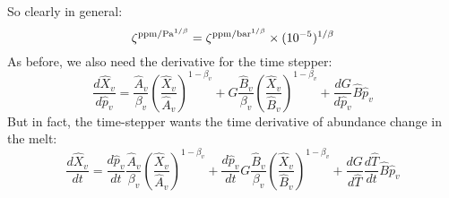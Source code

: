 So clearly in general:
\begin{equation}
\zeta^{{\rm ppm/Pa}^{1/\beta}} = \zeta^{{\rm ppm/bar}^{1/\beta}} \times (10^{-5})^{1/\beta}
\end{equation}
As before, we also need the derivative for the time stepper:
\begin{equation}
\frac{d \hat{X}_v}{d \hat{p}_v} = \frac{\hat{A}_v}{\beta_v} \left(\frac{\hat{X}_v}{\hat{A}_v}\right)^{1-\beta_v} + G \frac{\hat{B}_v}{\beta_v} \left(\frac{\hat{X}_v}{\hat{B}_v}\right)^{1-\beta_v} + \frac{dG}{d \hat{p}_v} \hat{B} \hat{p}_v
\end{equation}
But in fact, the time-stepper wants the time derivative of abundance change in the melt:
\begin{equation}
\frac{d \hat{X}_v}{d t} = \frac{d \hat{p}_v}{d t} \frac{\hat{A}_v}{\beta_v} \left(\frac{\hat{X}_v}{\hat{A}_v}\right)^{1-\beta_v} + \frac{d \hat{p}_v}{d t} G \frac{\hat{B}_v}{\beta_v} \left(\frac{\hat{X}_v}{\hat{B}_v}\right)^{1-\beta_v} + \frac{dG}{d\hat{T}} \frac{d\hat{T}}{dt} \hat{B} \hat{p}_v
\end{equation}

\begin{comment}
Introduce dimensional scalings and associate fugacities with partial pressure (ideal gas approximation):
\begin{equation}
V_0 \hat{X}_v = AP_0^{1/2} {p_{H_2O}}^\frac{1}{2}+B G P_0 p_{H_2O}
\end{equation}
Rearranging:
\begin{equation}
\hat{X}_v = \frac{A P_0^{1/2}}{V_0} {p_{H_2O}}^\frac{1}{2}+ \frac{B P_0}{V_0} G p_{H_2O}
\end{equation}
Therefore:
\begin{equation}
\hat{A} = \frac{A P_0^{1/2}}{V_0}, \qquad \hat{B} = \frac{B P_0}{V_0}
\end{equation}
We can generalise the scaling if we introduce some arbitrary pressure exponent, so we can account for both the $A$ and $B$ coefficients:
\begin{equation}
\hat{\zeta} = \frac{\zeta P_0^\beta}{V_0}
\end{equation}
This is comparable to the scaling for the non-dimensional Henry constant $\alpha$ calculated above.  Rearranging:
\begin{equation}
\zeta = \frac{\hat{\zeta} V_0}{P_0^\beta}
\end{equation}
In the code, we input $\zeta$ in units of ppm/Pa$^\beta$ to keep with convention.  
\end{comment}


